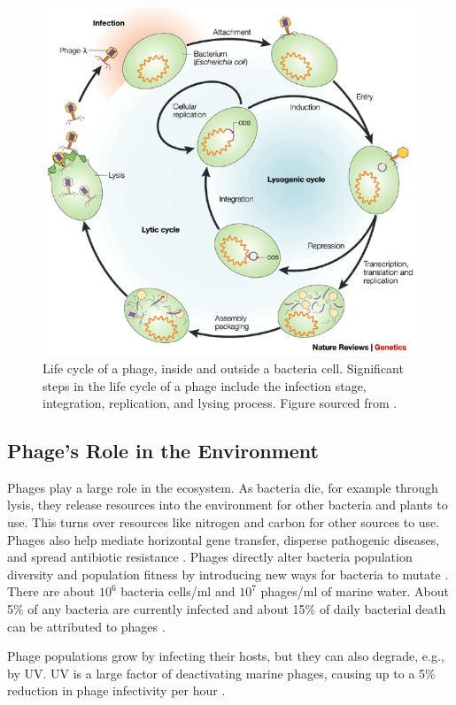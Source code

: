 \begin{figure}
    \centering
    \includegraphics[width=0.5\linewidth]{Figures/phage_life_cycle.png}
    \caption{Life cycle of a phage, inside and outside a bacteria cell. Significant steps in the life cycle of a phage include the infection stage, integration, replication, and lysing process. Figure sourced from \citet{campbellFutureBacteriophageBiology2003}. }
    \label{fig:phage_life_cycle}
\end{figure}

\subsection{Phage's Role in the Environment}
Phages play a large role in the ecosystem. 
As bacteria die, for example through lysis, they release resources into the environment for other bacteria and plants to use. 
This turns over resources like nitrogen and carbon for other sources to use. 
Phages also help mediate horizontal gene transfer, disperse pathogenic diseases, and spread antibiotic resistance \cite{al-shayebCladesHugePhages2020}. 
Phages directly alter bacteria population diversity and population fitness by introducing new ways for bacteria to mutate \cite{brownEcologicalFunctionalRoles2022}. 
There are about $10^6$ bacteria cells/ml and $10^7$ phages/ml of marine water. 
About 5\% of any bacteria are currently infected and about 15\% of daily bacterial death can be attributed to phages \cite{chibani-chennoufiPhageHostInteractionEcological2004}. 


Phage populations grow by infecting their hosts, but they can also degrade, e.g., by UV. 
UV is a large factor of deactivating marine phages, causing up to a 5\% reduction in phage infectivity per hour \cite{chibani-chennoufiPhageHostInteractionEcological2004}. 

